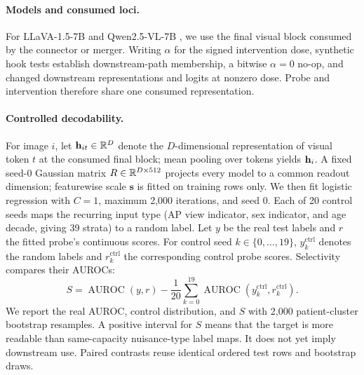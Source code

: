 \documentclass{article}
\begin{document}
\paragraph{Models and consumed loci.}
For LLaVA-1.5-7B \citep{liu2024improved} and Qwen2.5-VL-7B \citep{bai2025qwen25vl}, we use the final visual block consumed by the connector or merger. Writing $\alpha$ for the signed intervention dose, synthetic hook tests establish downstream-path membership, a bitwise $\alpha=0$ no-op, and changed downstream representations and logits at nonzero dose. Probe and intervention therefore share one consumed representation.

\paragraph{Controlled decodability.}
For image $i$, let $\mathbf{h}_{it}\in\mathbb{R}^D$ denote the $D$-dimensional representation of visual token $t$ at the consumed final block; mean pooling over tokens yields $\mathbf{h}_i$. A fixed seed-0 Gaussian matrix $R\in\mathbb{R}^{D\times512}$ projects every model to a common readout dimension; featurewise scale $\boldsymbol{s}$ is fitted on training rows only. We then fit logistic regression with $C=1$, maximum 2,000 iterations, and seed 0. Each of 20 control seeds maps the recurring input type (AP view indicator, sex indicator, and age decade, giving 39 strata) to a random label. Let $y$ be the real test labels and $r$ the fitted probe's continuous scores. For control seed $k\in\{0,\ldots,19\}$, $y_k^{\mathrm{ctrl}}$ denotes the random labels and $r_k^{\mathrm{ctrl}}$ the corresponding control probe scores. Selectivity compares their AUROCs:
\begin{equation}
S = \operatorname{AUROC}(y,r)-\frac{1}{20}\sum_{k=0}^{19}\operatorname{AUROC}(y_k^{\mathrm{ctrl}},r_k^{\mathrm{ctrl}}).
\label{eq:seed-selectivity}
\end{equation}
We report the real AUROC, control distribution, and $S$ with 2,000 patient-cluster bootstrap resamples. A positive interval for $S$ means that the target is more readable than same-capacity nuisance-type label maps. It does not yet imply downstream use. Paired contrasts reuse identical ordered test rows and bootstrap draws.
\end{document}

